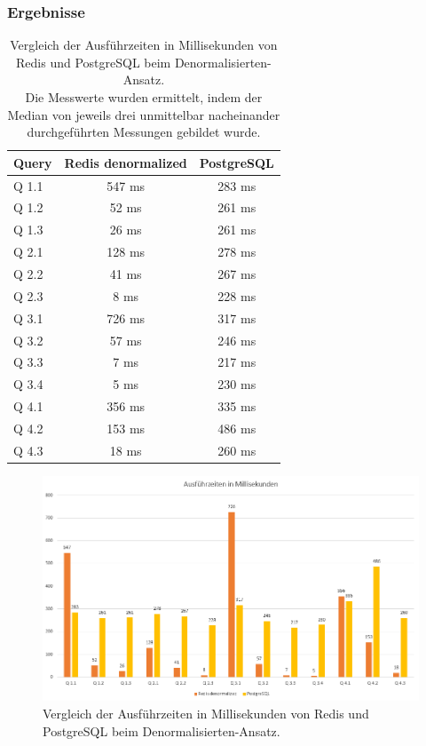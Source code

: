 \subsubsection{Ergebnisse}
\begin{table}[h]
\centering
\begin{tabular}{lcc}
\hline
Query & Redis denormalized & PostgreSQL \\ \hline
Q 1.1 & 547 ms  & 283 ms       \\
Q 1.2 & 52 ms   & 261 ms       \\
Q 1.3 & 26 ms   & 261 ms       \\
Q 2.1 & 128 ms  & 278 ms       \\
Q 2.2 & 41 ms   & 267 ms       \\
Q 2.3 & 8 ms    & 228 ms       \\
Q 3.1 & 726 ms  & 317 ms       \\
Q 3.2 & 57 ms   & 246 ms       \\
Q 3.3 & 7 ms    & 217 ms       \\
Q 3.4 & 5 ms    & 230 ms       \\
Q 4.1 & 356 ms  & 335 ms       \\
Q 4.2 & 153 ms  & 486 ms       \\
Q 4.3 & 18 ms   & 260 ms       \\ \hline
\end{tabular}
\caption{Vergleich der Ausführzeiten in Millisekunden von Redis und PostgreSQL beim Denormalisierten-Ansatz.\\
Die Messwerte wurden ermittelt, indem der Median von jeweils drei unmittelbar nacheinander durchgeführten Messungen gebildet wurde.}
\label{tab:results-denormalized}
\end{table}



\begin{figure}[ht]  %
    \centering      %
    \includegraphics[width=1\textwidth]{pictures/results/results-denormalized.png}
    \caption{Vergleich der Ausführzeiten in Millisekunden von Redis und PostgreSQL beim Denormalisierten-Ansatz.}      %
    \label{pic:results-denormalized}    %
\end{figure}

